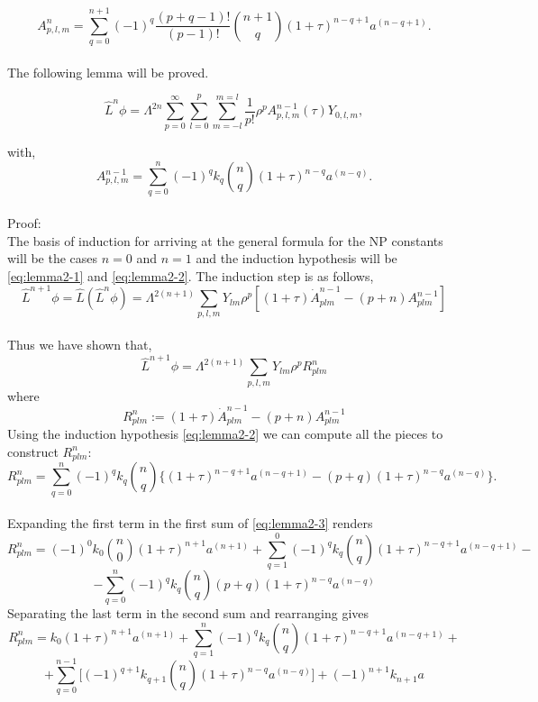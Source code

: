 \documentclass[
11pt, %
english, %
singlespacing, %
headsepline, %
]{MastersDoctoralThesis} %
\begin{document}
\begin{equation}\label{eq:A^n}
	A^n_{p,l,m} = \sum_{q=0}^{n+1}(-1)^q\frac{(p+q-1)!}{(p-1)!}\binom{n+1}{q}(1+\tau)^{n-q+1}a^{(n-q+1)}.
\end{equation}
\\
The following lemma will be proved.
\begin{lemma} 
\begin{equation}\label{eq:lemma2-1}
	\hat{L}^n \phi = \Lambda^{2n}\sum_{p = 0}^{\infty}\sum_{l = 0}^{p}\sum_{m = -l}^{m = l}\frac{1}{p!}\rho^{p}A^{n-1}_{p,l,m}(\tau)Y_{0,l,m},
\end{equation}
\end{lemma}
with,
\begin{equation}\label{eq:lemma2-2}
	A^{n-1}_{p,l,m} = \sum_{q=0}^{n}(-1)^q k_q \binom{n}{q}(1+\tau)^{n-q} a^{(n-q)}.
\end{equation}
\\
Proof:\\
The basis of induction for arriving at the general formula for the NP constants will be the cases $n=0$ and $n=1$ and the induction hypothesis will be \eqref{eq:lemma2-1} and \eqref{eq:lemma2-2}. The induction step is as follows,
$$\hat{L}^{n+1}\phi = \hat{L}(\hat{L}^n\phi) = \Lambda^{2(n+1)}\sum_{p,l,m}Y_{lm}\rho^p[(1+\tau)\dot{A}^{n-1}_{plm}-(p+n)A^{n-1}_{plm}]$$
\\
Thus we have shown that,
$$\hat{L}^{n+1}\phi = \Lambda^{2(n+1)}\sum_{p,l,m}Y_{lm}\rho^p R^n_{plm}$$
where
$$R^n_{plm} := (1+\tau)\dot{A}^{n-1}_{plm}-(p+n)A^{n-1}_{plm}$$
Using the induction hypothesis \eqref{eq:lemma2-2} we can compute all the pieces to construct $R^n_{plm}$:
\begin{equation}\label{eq:lemma2-3}
	R^{n}_{plm} = \sum_{q=0}^{n}(-1)^q k_q \binom{n}{q}\{(1+\tau)^{n-q+1} a^{(n-q+1)} - (p+q)(1+\tau)^{n-q} a^{(n-q)}\}.
\end{equation}
\\
Expanding the first term in the first sum of \eqref{eq:lemma2-3} renders
$$R^{n}_{plm} = (-1)^0 k_0 \binom{n}{0}(1+\tau)^{n+1} a^{(n+1)} + \sum_{q=1}^{0}(-1)^q k_q \binom{n}{q}(1+\tau)^{n-q+1} a^{(n-q+1)} - $$
$$-\sum_{q=0}^{n}(-1)^q k_q \binom{n}{q}(p+q)(1+\tau)^{n-q} a^{(n-q)}$$
Separating the last term in the second sum and rearranging gives
$$R^{n}_{plm} = k_0(1+\tau)^{n+1}a^{(n+1)} + \sum_{q=1}^{n}(-1)^q k_q \binom{n}{q}(1+\tau)^{n-q+1} a^{(n-q+1)} + $$
$$ + \sum_{q=0}^{n-1} \bigg[(-1)^{q+1}k_{q+1}\binom{n}{q}(1+\tau)^{n-q}a^{(n-q)}\bigg] + (-1)^{n+1}k_{n+1}a$$
\\
\end{document}
